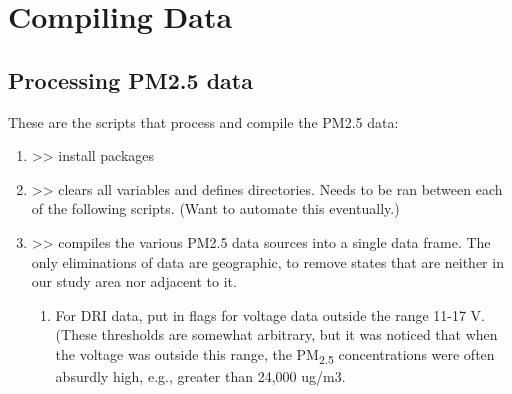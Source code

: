 \section{Compiling Data}

\subsection{Processing PM2.5 data}

These are the scripts that process and compile the PM2.5 data:
\begin{enumerate}[nolistsep]
\item {} >> install packages

\item {} >> clears all variables and defines directories. Needs to be ran between each of the following scripts. (Want to automate this eventually.)

\item {} >> compiles the various PM2.5 data sources into a single data frame. The only eliminations of data are geographic, to remove states that are neither in our study area nor adjacent to it.
	\begin{enumerate}
	\item For DRI data, put in flags for voltage data outside the range 11-17 V. (These thresholds are somewhat arbitrary, but it was noticed that when the voltage was outside this range, the PM\textsubscript{2.5} concentrations were often absurdly high, e.g., greater than 24,000 ug/m3.
	\end{enumerate}


\end{enumerate}
